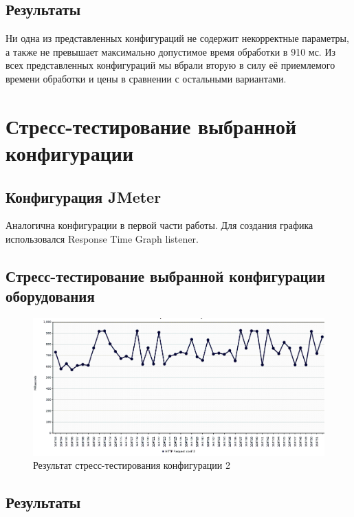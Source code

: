 \documentclass[a4paper,10pt]{article}
\begin{document}
\newpage

	\subsection*{Результаты}
	
	Ни одна из представленных конфигураций не содержит некорректные параметры, а также не превышает максимально
	допустимое время обработки в 910 мс. Из всех представленных конфигураций мы вбрали вторую в силу её
    приемлемого времени обработки и цены в сравнении с остальными вариантами.

\newpage

\section*{Стресс-тестирование выбранной конфигурации}

	\subsection*{Конфигурация JMeter}
		Аналогична конфигурации в первой части работы. Для создания графика использовался Response Time Graph listener.

	\subsection*{Стресс-тестирование выбранной конфигурации оборудования}
		\begin{figure}[h!]
			\includegraphics[scale=0.5]{./img/stresstest_conf2.png}
			\caption{Результат стресс-тестирования конфигурации 2}
		\end{figure}

	\subsection*{Результаты}
\end{document}
